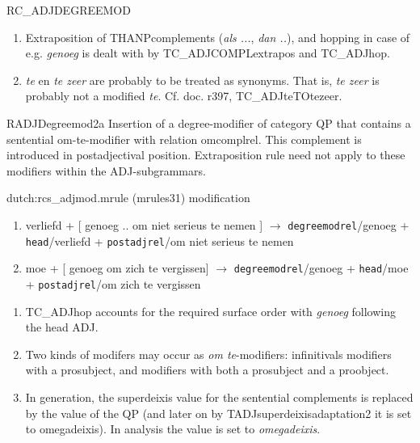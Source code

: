 \begin{mruleclass}{RC\_ADJDEGREEMOD}
\begin{members}
\begin{member}
\remarks\mbox{}
\begin{enumerate}
\item
Extraposition of THANPcomplements ({\em als ...}, {\em dan ..}), and hopping in
case of e.g. {\em genoeg} is dealt with by TC\_ADJCOMPLextrapos and TC\_ADJhop.
\item {\em te} en {\em te zeer} are probably to be treated
as synonyms. That is, {\em te zeer} is probably not
a modified {\em te}.
Cf. doc. r397, TC\_ADJteTOtezeer. 
\end{enumerate}

\end{member}
\begin{member}
 RADJDegreemod2a
 Insertion of a degree-modifier of category QP 
that contains a sentential om-te-modifier with relation omcomplrel. This 
complement is introduced in postadjectival position. Extraposition rule need 
not apply to these modifiers within the ADJ-subgrammars.
 
\file dutch:rcs\_adjmod.mrule (mrules31)
\semantics modification 
\example
\begin{enumerate}
  \item 

verliefd + [ genoeg .. om niet serieus te nemen ] $\rightarrow$
{\tt degreemodrel}/genoeg + {\tt head}/verliefd + {\tt postadjrel}/om niet serieus te nemen

  \item 
moe + [ genoeg om zich te vergissen] $\rightarrow$
{\tt degreemodrel}/genoeg + {\tt head}/moe + {\tt postadjrel}/om zich te vergissen
\end{enumerate}
\remarks\mbox{}
\begin{enumerate}
\item TC\_ADJhop accounts for the required surface order with {\em genoeg}
following the head ADJ. 
\item  Two kinds of modifers may occur as  {\em om te}-modifiers:
infinitivals modifiers with a prosubject, and modifiers with both a prosubject 
and a proobject.
\item In generation, the superdeixis value 
for the sentential complements is replaced by the value of the QP (and later on 
by TADJsuperdeixisadaptation2 it is set to omegadeixis).
In analysis the value
is set to {\em omegadeixis}.

\end{enumerate}


\end{member}
\end{members}
\end{mruleclass}
